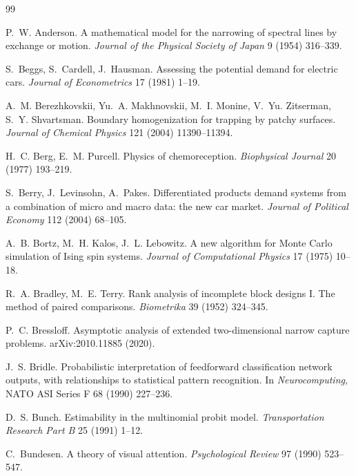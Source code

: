 \documentclass[11pt]{article}
\theoremstyle{remark}
\begin{document}
\begin{thebibliography}{99}

 P.~W. Anderson. A mathematical model for
the narrowing of spectral lines by exchange or motion. \emph{Journal of the
Physical Society of Japan} 9 (1954) 316--339.

 S.~Beggs,
S.~Cardell, J.~Hausman. Assessing the potential demand for electric cars.
\emph{Journal of Econometrics} 17 (1981) 1--19.

 A.~M. Berezhkovskii,
Yu.~A. Makhnovskii, M.~I. Monine, V.~Yu. Zitserman, S.~Y. Shvartsman. Boundary
homogenization for trapping by patchy surfaces. \emph{Journal of Chemical
Physics} 121 (2004) 11390--11394.

 H.~C. Berg, E.~M. Purcell. Physics of
chemoreception. \emph{Biophysical Journal} 20 (1977) 193--219.

 S.~Berry, J.~Levinsohn, A.~Pakes.
Differentiated products demand systems from a combination of micro and macro
data: the new car market. \emph{Journal of Political Economy} 112 (2004)
68--105.

 A.~B. Bortz, M.~H. Kalos, J.~L. Lebowitz.
A new algorithm for Monte Carlo simulation of Ising spin systems.
\emph{Journal of Computational Physics} 17 (1975) 10--18.

 R.~A. Bradley, M.~E. Terry.
Rank analysis of incomplete block designs I. The method of paired comparisons.
\emph{Biometrika} 39 (1952) 324--345.

 P.~C. Bressloff. Asymptotic analysis of
extended two-dimensional narrow capture problems. arXiv:2010.11885 (2020).

 J.~S. Bridle. Probabilistic interpretation of
feedforward classification network outputs, with relationships to statistical
pattern recognition. In \emph{Neurocomputing}, NATO ASI Series F 68 (1990)
227--236.

 D.~S. Bunch. Estimability in the multinomial
probit model. \emph{Transportation Research Part B} 25 (1991) 1--12.

 C.~Bundesen. A theory of visual
attention. \emph{Psychological Review} 97 (1990) 523--547.


\end{thebibliography}
\end{document}

